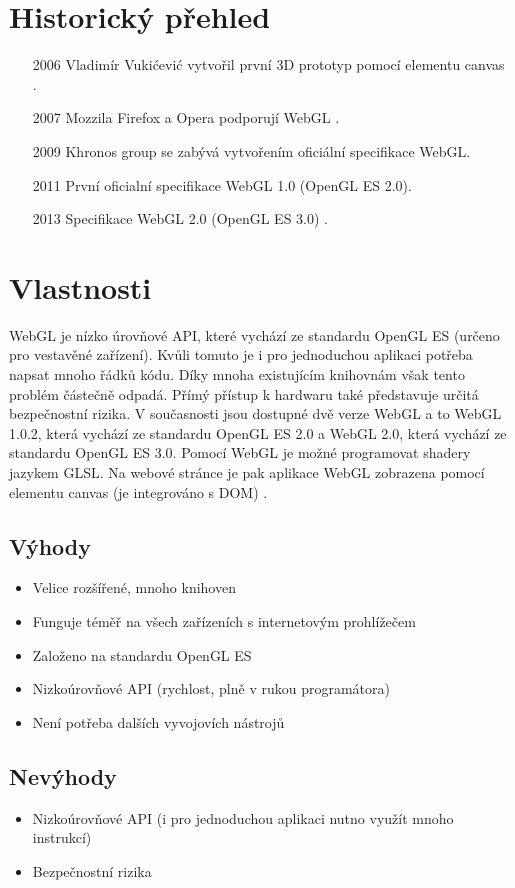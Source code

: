 \documentclass[12pt,a4paper,titlepage,final]{report}
\begin{document}
\section{Historický přehled}
\begin{itemize}
	\item[2006] Vladimír Vukićević vytvořil první 3D prototyp pomocí elementu canvas \cite{history}.
	\item[2007] Mozzila Firefox a Opera podporují WebGL \cite{history}.
	\item[2009] Khronos group se zabývá vytvořením oficiální specifikace WebGL.
	\item[2011] První oficialní specifikace WebGL 1.0 (OpenGL ES 2.0)\cite{history}.
	\item[2013] Specifikace WebGL 2.0 (OpenGL ES 3.0) \cite{history2}.
\end{itemize}

\section{Vlastnosti}
WebGL je nízko úrovňové API, které vychází ze standardu OpenGL ES (určeno pro vestavěné zařízení). Kvůli tomuto je i pro jednoduchou aplikaci potřeba napsat mnoho řádků kódu. Díky mnoha existujícím knihovnám však tento problém částečně odpadá. Přímý přístup k hardwaru také představuje určitá bezpečnostní rizika. V současnosti jsou dostupné dvě verze WebGL a to WebGL 1.0.2, která vychází ze standardu OpenGL ES 2.0 a WebGL 2.0, která vychází ze standardu OpenGL ES 3.0. Pomocí WebGL je možné programovat shadery jazykem GLSL. Na webové stránce je pak aplikace WebGL zobrazena pomocí elementu canvas (je integrováno s DOM) \cite{khronos}.

\subsection{Výhody}
\begin{itemize}
	\item Velice rozšířené, mnoho knihoven
	\item Funguje téměř na všech zařízeních s internetovým prohlížečem	
	\item Založeno na standardu OpenGL ES
  \item Nizkoúrovňové API (rychlost, plně v rukou programátora)
  \item Není potřeba dalších vyvojovích nástrojů
\end{itemize}
\subsection{Nevýhody}
\begin{itemize}
	\item Nizkoúrovňové API (i pro jednoduchou aplikaci nutno využít mnoho instrukcí)
	\item Bezpečnostní rizika	
\end{itemize}
\end{document}
